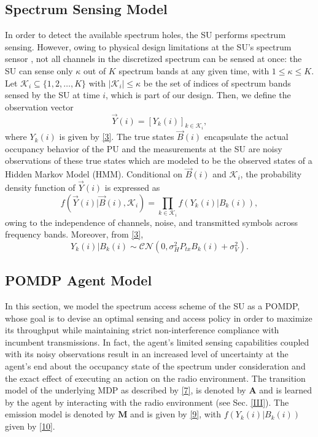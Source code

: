 \documentclass[10pt,twocolumn]{IEEEtran}
\begin{document}
\subsection{Spectrum Sensing Model}
In order to detect the available spectrum holes, the SU performs spectrum sensing. However, owing to physical design limitations at the SU's spectrum sensor \cite{5990482}, not all channels in the discretized spectrum can be sensed at once: the SU can sense only $\kappa$ out of $K$ spectrum bands at any given time, with $1\leq \kappa\leq K$. Let $\mathcal K_{i}\subseteq\{1,2,\dots,K\}$ with $|\mathcal K_i|\leq \kappa$ be the set of indices of spectrum bands sensed by the SU at time $i$, which is part of our design.
Then, we define the observation vector
\begin{equation}\label{8}
    \vec{Y}(i) = [Y_k(i)]_{k {\in} \mathcal K_i},
\end{equation}
where $Y_k(i)$ is given by \eqref{3}.
The true states $\vec{B}(i)$ encapsulate the actual occupancy behavior of the PU and the measurements at the SU are noisy observations of these true states which are modeled to be the observed states of a Hidden Markov Model (HMM). 
Conditional on $\vec{B}(i)$ and $\mathcal K_i$, the probability density function of $\vec{Y}(i)$ is expressed as
\begin{equation}\label{9}
    f(\vec{Y}(i)|\vec{B}(i), \mathcal K_i) = \prod_{k \in \mathcal K_i} f(Y_k(i)|B_k(i)),
\end{equation}
owing to the independence of channels, noise, and transmitted symbols across frequency bands. Moreover, from \eqref{3},
\begin{equation}\label{10}
 Y_k(i)|B_k(i) \sim \mathcal{CN}(0, \sigma_H^2P_{tx}B_k(i) + \sigma_V^2).
\end{equation}
\subsection{POMDP Agent Model}
In this section, we model the spectrum access scheme of the SU as a POMDP, whose goal is to devise an optimal sensing and access policy in order to maximize its throughput while maintaining strict non-interference compliance with incumbent transmissions. In fact, the agent's limited sensing capabilities coupled with its noisy observations result in an increased level of uncertainty at the agent's end about the occupancy state of the spectrum under consideration and the exact effect of executing an action on the radio environment. The transition model of the underlying MDP as described by \eqref{7}, is denoted by $\mathbf{A}$ and is learned by the agent by interacting with the radio environment (see Sec. \ref{III}). The emission model is denoted by $\mathbf{M}$ and is given by \eqref{9}, with $f(Y_k(i)|B_k(i))$ given by \eqref{10}. 
\end{document}
